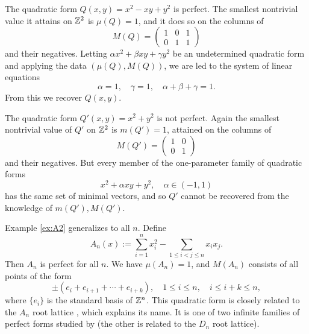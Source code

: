 \begin{example}\label{ex:A2}
The quadratic form $Q (x,y) =  x^{2}-xy+y^{2}$ is perfect.  The smallest
nontrivial value
it attains on $\mathbb{Z}^{2}$ is $\mu (Q) = 1$, and it does so on the columns of 
\[
M (Q) =\left(\begin{array}{ccc}
1&0&1\\
0&1&1
\end{array} \right)
\]   
and their negatives.   Letting $\alpha x^{2}+\beta xy + \gamma
y^{2}$ be an undetermined quadratic form and applying the data $(\mu
(Q), M (Q))$, we are led to the system of linear equations 
\[
\alpha =1, \quad \gamma =1, \quad \alpha +\beta +\gamma =1.
\]
From this we recover $Q (x,y)$.
\end{example}

\begin{example}\label{ex:cubicform}
The quadratic form $Q' (x,y) = x^{2}+y^{2}$ is not perfect.  Again the
smallest nontrivial value of $Q'$ on $\mathbb{Z}^{2}$ is $m (Q')= 1$, attained on the
columns of 
\[
M (Q')=\left (\begin{array}{cc}
1&0\\
0&1
\end{array}\right)
\]
and their negatives.  But every member of the one-parameter family of quadratic forms 
\begin{equation}\label{}
x^{2}+\alpha xy+y^{2}, \quad \alpha \in (-1,1)
\end{equation}
has the same
set of minimal vectors, and so $Q'$ cannot be recovered from the
knowledge of $m (Q'), M (Q')$.
\end{example}

\begin{example}\label{ex:An}
Example \ref{ex:A2} generalizes to all $n$.  Define
\begin{equation}\label{anform}
A_{n} (x) := \sum_{i=1}^{n}x_{i}^{2} - \sum_{1\leq i<j\leq n} x_{i}x_{j}.
\end{equation}
Then $A_{n}$ is perfect for all $n$.  We have $\mu
(A_{n})=1$, and $M (A_{n})$ consists of all points of the form
\[
\pm (e_{i}+e_{i+1}+\dotsb + e_{i+k}), \quad 1\leq i\leq n, \quad i\leq i+k\leq n,
\]
where $\{e_{i} \}$ is the standard basis of $\mathbb{Z}^{n}$.  This quadratic
form is closely related to the $A_{n}$ root lattice
\cite{fulton.harris}, which explains its name.  It is one of two
infinite families of perfect forms studied by \Vor (the other is
related to the $D_{n}$ root lattice).
\end{example}

